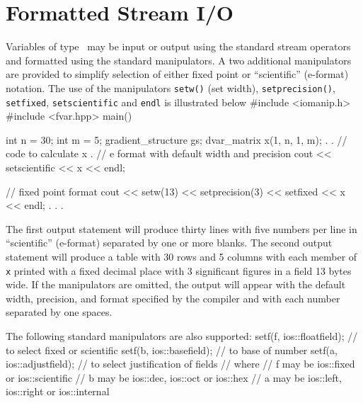 \documentclass[12pt]{book}
\begin{document}
\section{Formatted Stream I/O}
Variables of type \adtypes\ may be input or output using the
standard stream operators and formatted using the standard
manipulators. A two additional manipulators are provided to
simplify selection of either fixed point or ``scientific''
(e-format) notation.
The use of the manipulators {\tt setw()} (set width),
{\tt setprecision()}, {\tt setfixed}, {\tt setscientific}
and {\tt endl} is illustrated below
\beginexample
#include <iomanip.h>
#include <fvar.hpp>
main()
{
  int n = 30;
  int m = 5;
  gradient_structure gs;
  dvar_matrix x(1, n, 1, m);
  .
  .   // code to calculate x
  . 
  // e format with default width and precision
  cout << setscientific << x << endl;

  // fixed point format
  cout << setw(13) << setprecision(3) << setfixed << x << endl;
  .
  .
  .  
}
\endexample
\noindent 
The first output statement will produce thirty lines with five numbers
per line in ``scientific'' (e-format) separated by one or more blanks.
The second output statement will produce a table with 30 rows and 5 columns
with each member of {\tt x} printed with a fixed decimal place
with 3 significant figures in a field 13 bytes wide.
If the manipulators are omitted, the output will appear with the
default width, precision, and format specified by the compiler and with each
number separated by one spaces.

\goodbreak
The following standard manipulators are also supported:
\beginexample
setf(f, ios::floatfield);  // to select fixed or scientific
setf(b, ios::basefield);   // to base of number
setf(a, ios::adjustfield); // to select justification of fields
// where
//   f  may be ios::fixed or ios::scientific
//   b  may be ios::dec, ios::oct or ios::hex
//   a  may be ios::left, ios::right or ios::internal
\endexample

 
\end{document}
